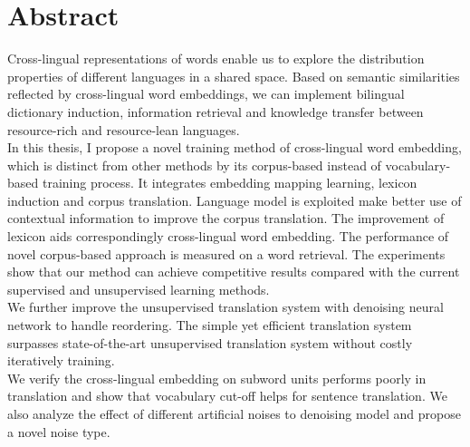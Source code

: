 \chapter{Abstract}
Cross-lingual representations of words enable us to explore the distribution properties of different languages in a shared space. Based on semantic similarities reflected by cross-lingual word embeddings, we can implement bilingual dictionary induction, information retrieval and knowledge transfer between resource-rich and resource-lean languages.\\
In this thesis, I propose a novel training method of cross-lingual word embedding, which is distinct from other methods by  its corpus-based instead of vocabulary-based training process. It integrates embedding mapping learning, lexicon induction and corpus translation. 
Language model is exploited make better use of contextual information to improve the corpus translation.  The improvement of lexicon aids correspondingly cross-lingual word embedding. The performance of novel corpus-based approach is measured on a word retrieval. The experiments show that our method can achieve competitive results compared with the current supervised and unsupervised learning methods. \\
We further improve the unsupervised translation system with denoising neural network to handle reordering. The simple yet efficient translation system surpasses state-of-the-art unsupervised translation system without costly iteratively training.\\
We verify the cross-lingual embedding on subword units performs poorly in translation and show that vocabulary cut-off helps for sentence translation. We also analyze the effect of different artificial noises to denoising model and propose a novel noise type.


